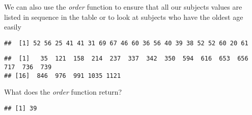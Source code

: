 \documentclass[
]{article}
\newenvironment{Shaded}{\begin{snugshade}}{\end{snugshade}}
\newcommand{\CommentTok}[1]{\textcolor[rgb]{0.56,0.35,0.01}{\textit{#1}}}
\newcommand{\DecValTok}[1]{\textcolor[rgb]{0.00,0.00,0.81}{#1}}
\newcommand{\FunctionTok}[1]{\textcolor[rgb]{0.13,0.29,0.53}{\textbf{#1}}}
\newcommand{\NormalTok}[1]{#1}
\newcommand{\SpecialCharTok}[1]{\textcolor[rgb]{0.81,0.36,0.00}{\textbf{#1}}}
\newcommand{\StringTok}[1]{\textcolor[rgb]{0.31,0.60,0.02}{#1}}
\begin{document}
\(~\)

We can also use the \emph{order} function to ensure that all our
subjects values are listed in sequence in the table or to look at
subjects who have the oldest age easily

\begin{Shaded}
\end{Shaded}

\begin{verbatim}
##  [1] 52 56 25 41 41 31 69 67 46 60 36 56 40 39 38 52 52 60 20 61
\end{verbatim}

\begin{Shaded}
\end{Shaded}

\begin{verbatim}
##  [1]   35  121  158  214  237  337  342  350  594  616  653  656  717  736  739
## [16]  846  976  991 1035 1121
\end{verbatim}

What does the \emph{order} function return?

\begin{Shaded}
\end{Shaded}

\begin{verbatim}
## [1] 39
\end{verbatim}

\begin{Shaded}
\end{Shaded}
\end{document}
